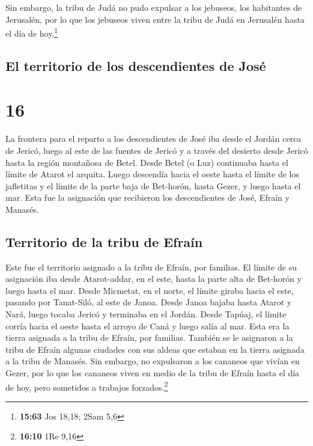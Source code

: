  Sin embargo, la tribu de Judá no pudo expulsar a los
jebuseos, los habitantes de Jerusalén, por lo que los jebuseos viven
entre la tribu de Judá en Jerusalén hasta el día de hoy.\footnote{\textbf{15:63}
  Jos 18,18; 2Sam 5,6}

\hypertarget{el-territorio-de-los-descendientes-de-josuxe9}{%
\subsection{El territorio de los descendientes de
José}\label{el-territorio-de-los-descendientes-de-josuxe9}}

\hypertarget{section-15}{%
\section{16}\label{section-15}}

 La frontera para el reparto a los descendientes de José
iba desde el Jordán cerca de Jericó, luego al este de las fuentes de
Jericó y a través del desierto desde Jericó hasta la región montañosa de
Betel.  Desde Betel (o Luz) continuaba hasta el límite de
Atarot el arquita.  Luego descendía hacia el oeste hasta
el límite de los jafletitas y el límite de la parte baja de Bet-horón,
hasta Gezer, y luego hasta el mar.  Esta fue la asignación
que recibieron los descendientes de José, Efraín y Manasés.

\hypertarget{territorio-de-la-tribu-de-efrauxedn}{%
\subsection{Territorio de la tribu de
Efraín}\label{territorio-de-la-tribu-de-efrauxedn}}

 Este fue el territorio asignado a la tribu de Efraín, por
familias. El límite de su asignación iba desde Atarot-addar, en el este,
hasta la parte alta de Bet-horón  y luego hasta el mar.
Desde Micmetat, en el norte, el límite giraba hacia el este, pasando por
Tanat-Siló, al este de Janoa.  Desde Janoa bajaba hasta
Atarot y Nará, luego tocaba Jericó y terminaba en el Jordán.
 Desde Tapúaj, el límite corría hacia el oeste hasta el
arroyo de Caná y luego salía al mar. Esta era la tierra asignada a la
tribu de Efraín, por familias.  También se le asignaron a
la tribu de Efraín algunas ciudades con sus aldeas que estaban en la
tierra asignada a la tribu de Manasés.  Sin embargo, no
expulsaron a los cananeos que vivían en Gezer, por lo que los cananeos
viven en medio de la tribu de Efraín hasta el día de hoy, pero sometidos
a trabajos forzados.\footnote{\textbf{16:10} 1Re 9,16}

